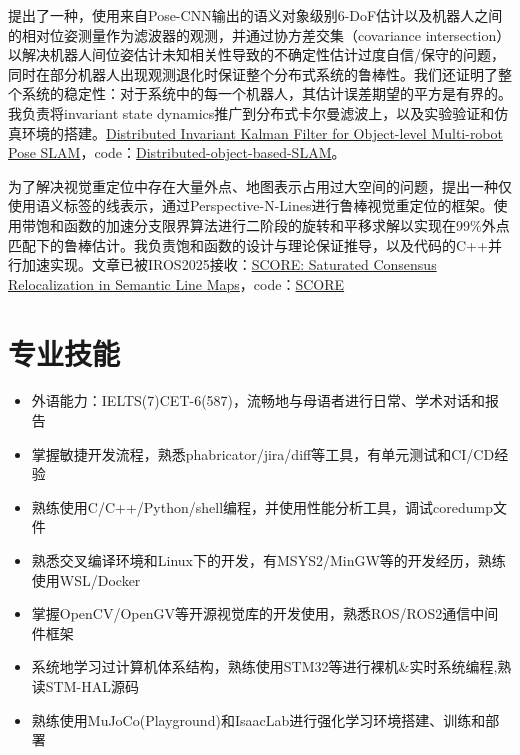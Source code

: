 \documentclass{resume}
\begin{document}
提出了一种\textbf{}，使用来自Pose-CNN输出的语义对象级别6-DoF估计以及机器人之间的相对位姿测量作为滤波器的观测，并通过协方差交集（covariance intersection）以解决机器人间位姿估计未知相关性导致的不确定性估计过度自信/保守的问题，同时在部分机器人出现观测退化时保证整个分布式系统的鲁棒性。我们还证明了整个系统的稳定性：对于系统中的每一个机器人，其估计误差期望的平方是有界的。我负责将invariant state dynamics推广到分布式卡尔曼滤波上，以及实验验证和仿真环境的搭建。\textcolor{blue}{\href{https://ieeexplore.ieee.org/document/11128538}{Distributed Invariant Kalman Filter for Object-level Multi-robot Pose SLAM}}，code：\textcolor{blue}{\href{https://github.com/LIAS-CUHKSZ/Distributed-object-based-SLAM}{Distributed-object-based-SLAM}}。

为了解决视觉重定位中存在大量外点、地图表示占用过大空间的问题，提出一种仅使用语义标签的线表示，通过Perspective-N-Lines进行鲁棒视觉重定位的框架。使用带饱和函数的加速分支限界算法进行二阶段的旋转和平移求解以实现在99\%外点匹配下的鲁棒估计。我负责饱和函数的设计与理论保证推导，以及代码的C++并行加速实现。文章已被IROS2025接收：\textcolor{blue}{\href{https://arxiv.org/pdf/2503.03254}{SCORE: Saturated Consensus Relocalization in Semantic Line Maps}}，code：\textcolor{blue}{\href{https://github.com/LIAS-CUHKSZ/SCORE}{SCORE}}

\section{专业技能}
\begin{itemize}[parsep=0.5ex]
 \item 外语能力：IELTS(7)\quad CET-6(587)，流畅地与母语者进行日常、学术对话和报告
 \item 掌握敏捷开发流程，熟悉phabricator/jira/diff等工具，有单元测试和CI/CD经验
 \item 熟练使用C/C++/Python/shell编程，并使用性能分析工具，调试coredump文件
 \item 熟悉交叉编译环境和Linux下的开发，有MSYS2/MinGW等的开发经历，熟练使用WSL/Docker
 \item 掌握OpenCV/OpenGV等开源视觉库的开发使用，熟悉ROS/ROS2通信中间件框架
 \item 系统地学习过计算机体系结构，熟练使用STM32等进行裸机\&实时系统编程,熟读STM-HAL源码
 \item 熟练使用MuJoCo(Playground)和IsaacLab进行强化学习环境搭建、训练和部署
\end{itemize}
\end{document}
